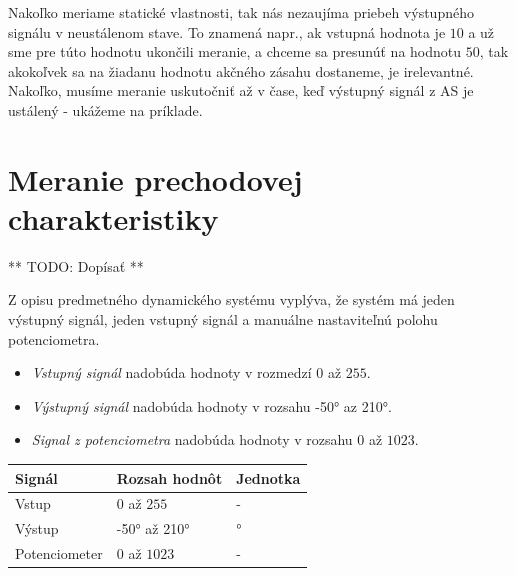 \documentclass[a4paper, 10pt, ]{article}
\begin{document}
Nakoľko meriame statické vlastnosti, tak nás nezaujíma priebeh výstupného signálu v neustálenom stave. To znamená napr., ak vstupná hodnota je $10$ a už sme pre túto hodnotu ukončili meranie, a chceme sa presunúť na hodnotu $50$, tak akokoľvek sa na žiadanu hodnotu akčného zásahu dostaneme, je irelevantné. Nakoľko, musíme meranie uskutočniť až v čase, keď výstupný signál z AS je ustálený - ukážeme na príklade.


\section{Meranie prechodovej charakteristiky}

** TODO: Dopísať **

Z opisu predmetného dynamického systému vyplýva, že systém má jeden výstupný signál, jeden vstupný signál a manuálne nastaviteľnú polohu potenciometra.

\begin{itemize}
    \item \emph{Vstupný signál} nadobúda hodnoty v rozmedzí $0$ až $255$.

    \item \emph{Výstupný signál} nadobúda hodnoty v rozsahu \ang{-50} az \ang{210}.

    \item \emph{Signal z potenciometra} nadobúda hodnoty v rozsahu $0$ až $1023$.
\end{itemize}


\begin{center}

    \vspace{-10pt}

    \label{tab:rozsahy_a_jednotky_signalu}

    \lstyle

    \begin{tabular*}{\textwidth}{@{ \extracolsep{\fill}} lll}
        \toprule
        Signál & Rozsah hodnôt & Jednotka \\
        \midrule
        Vstup & $0$ až $255$ & - \\
        Výstup & \ang{-50} až \ang{210} & \si{\degree} \\
        Potenciometer & $0$ až $1023$ & - \\
        \bottomrule
    \end{tabular*}


\end{center}
\end{document}
